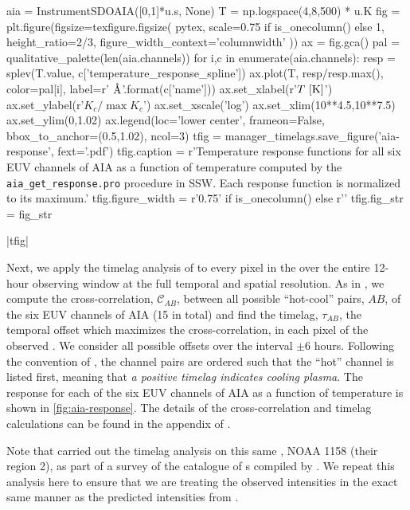 \begin{pycode}
aia = InstrumentSDOAIA([0,1]*u.s, None)
T = np.logspace(4,8,500) * u.K
fig = plt.figure(figsize=texfigure.figsize(
    pytex,
    scale=0.75 if is_onecolumn() else 1,
    height_ratio=2/3,
    figure_width_context='columnwidth'
))
ax = fig.gca()
pal = qualitative_palette(len(aia.channels))
for i,c in enumerate(aia.channels):
    resp = splev(T.value, c['temperature_response_spline'])
    ax.plot(T, resp/resp.max(), color=pal[i], label=r'{} $\textup{{\AA}}$'.format(c['name']))
ax.set_xlabel(r'$T\,\,[\textup{K}]$')
ax.set_ylabel(r'$K_c/\max{K_c}$')
ax.set_xscale('log')
ax.set_xlim(10**4.5,10**7.5)
ax.set_ylim(0,1.02)
ax.legend(loc='lower center', frameon=False, bbox_to_anchor=(0.5,1.02), ncol=3)
tfig = manager_timelags.save_figure('aia-response', fext='.pdf')
tfig.caption = r'Temperature response functions for all six EUV channels of AIA as a function of temperature computed by the \texttt{aia\_get\_response.pro} procedure in SSW. Each response function is normalized to its maximum.'
tfig.figure_width = r'0.75\columnwidth' if is_onecolumn() else r'\columnwidth'
tfig.fig_str = fig_str
\end{pycode}
|tfig|

Next, we apply the timelag analysis of \citet{viall_evidence_2012} to every pixel in the \AR{} over the entire 12-hour observing window at the full temporal and spatial resolution. As in , we compute the cross-correlation, $\mathcal{C}_{AB}$, between all possible ``hot-cool'' pairs, $AB$, of the six EUV channels of AIA (15 in total) and find the timelag, $\tau_{AB}$, the temporal offset which maximizes the cross-correlation, in each pixel of the observed \AR{}. We consider all possible offsets over the interval $\pm6$ hours. Following the convention of \citet{viall_evidence_2012}, the channel pairs are ordered such that the ``hot'' channel is listed first, meaning that \textit{a positive timelag indicates cooling plasma}. The response for each of the six EUV channels of AIA as a function of temperature is shown in \autoref{fig:aia-response}. The details of the cross-correlation and timelag calculations can be found in the appendix of .

Note that \citet{viall_survey_2017} carried out the timelag analysis on this same \AR{}, NOAA 1158 (their region 2), as part of a survey of the catalogue of \AR{}s compiled by \citet{warren_systematic_2012}. We repeat this analysis here to ensure that we are treating the observed intensities in the exact same manner as the predicted intensities from .

